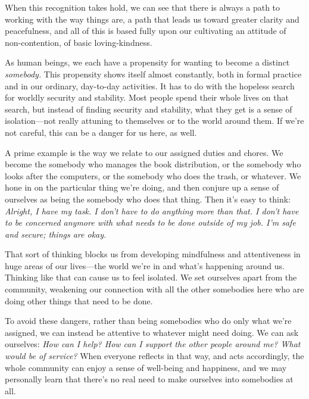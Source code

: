 When this recognition takes hold, we can see that there is always a 
path to working with the way things are, a path that leads us toward 
greater clarity and peacefulness, and all of this is based fully upon 
our cultivating an attitude of non-contention, of basic loving-kindness.


As human beings, we each have a propensity for wanting to become a 
distinct \emph{somebody.} This propensity shows itself almost 
constantly, both in formal practice and in our ordinary, day-to-day 
activities. It has to do with the hopeless search for worldly security 
and stability. Most people spend their whole lives on that search, but 
instead of finding security and stability, what they get is a sense of 
isolation---not really attuning to themselves or to the world around 
them. If we're not careful, this can be a danger for us here, as well.

A prime example is the way we relate to our assigned duties and chores. 
We become the somebody who manages the book distribution, or the 
somebody who looks after the computers, or the somebody who does the 
trash, or whatever. We hone in on the particular thing we're doing, and 
then conjure up a sense of ourselves as being the somebody who does 
that thing. Then it's easy to think: \emph{Alright, I have my task. I 
don't have to do anything more than that. I don't have to be concerned 
anymore with what needs to be done outside of my job. I'm safe and 
secure; things are okay.}

That sort of thinking blocks us from developing mindfulness and 
attentiveness in huge areas of our lives---the world we're in and 
what's happening around us. Thinking like that can cause us to feel 
isolated. We set ourselves apart from the community, weakening our 
connection with all the other somebodies here who are doing other 
things that need to be done.

To avoid these dangers, rather than being somebodies who do only what 
we're assigned, we can instead be attentive to whatever might need 
doing. We can ask ourselves: \emph{How can I help? How can I support 
the other people around me? What would be of service?} When everyone 
reflects in that way, and acts accordingly, the whole community can 
enjoy a sense of well-being and happiness, and we may personally learn 
that there's no real need to make ourselves into somebodies at all.

